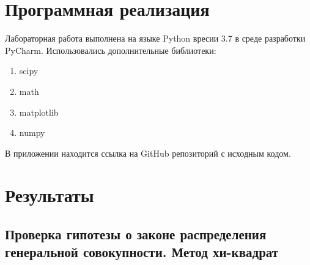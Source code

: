 \documentclass{article}
\begin{document}
\section{Программная реализация}
\noindent Лабораторная работа выполнена на языке Python вресии 3.7 в среде разработки PyCharm. Использовались дополнительные библиотеки:
 \begin{enumerate}
        \item scipy
        \item math 
        \item matplotlib 
        \item numpy
    \end{enumerate}
В приложении находится ссылка на GitHub репозиторий с исходным кодом.

\section{Результаты}

\subsection{Проверка гипотезы о законе распределения генеральной совокупности. Метод хи-квадрат}
\end{document}
